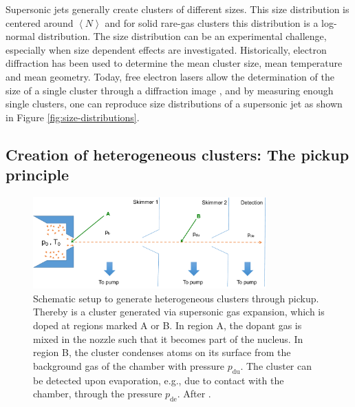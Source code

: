 %
Supersonic jets generally create clusters of different sizes. This size distribution is centered around $\left\langle N\right\rangle$ and for solid rare-gas clusters this distribution is a log-normal distribution. The size distribution can be an experimental challenge, especially when size dependent effects are investigated. Historically, electron diffraction \citep{Farges-1981-SurfSci,Bartell-1986-ChemRev} has been used to determine the mean cluster size, mean temperature and mean geometry. Today, free electron lasers allow the determination of the size of a single cluster through a diffraction image \citep{Rupp-2012-NJP}, and by measuring enough single clusters, one can reproduce size distributions of a supersonic jet as shown in Figure \ref{fig:size-distributions}.
%
%
%
%
%
%
\subsection{Creation of heterogeneous clusters: The pickup principle}\label{sec:heterogeneous-cluster}
\begin{figure}
	\centering
		\includegraphics[width=0.80\textwidth]{images/pick-up.pdf}
	\caption[Schematic of a pickup (gas-)source.]{Schematic setup to generate heterogeneous clusters through pickup. Thereby is a cluster generated via supersonic gas expansion, which is doped at regions marked A or B. In region A, the dopant gas is mixed in the nozzle such that it becomes part of the nucleus. In region B, the cluster condenses atoms on its surface from the background gas of the chamber with pressure $p_{\text{du}}$. The cluster can be detected upon evaporation, e.g., due to contact with the chamber, through the pressure $p_{\text{de}}$. After \citep{Gough-1985-JChemPhys,Haberland-1994-Springer}.}
	\label{fig:pickupPrinciple}
\end{figure}
